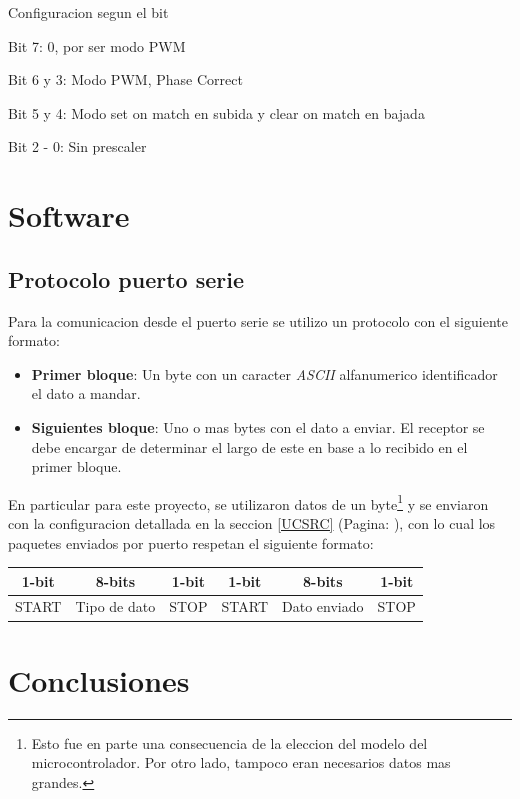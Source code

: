 \documentclass[10pt,spanish,a4paper,openany,notitlepage]{article}
\begin{document}
\begin{description}
\item{Configuracion segun el bit}
\item{Bit 7}: 0, por ser modo PWM
\item{Bit 6 y 3}: Modo PWM, Phase Correct
\item{Bit 5 y 4}: Modo set on match en subida y clear on match en bajada
\item{Bit 2 - 0}: Sin prescaler
\end{description}

\section{Software}

\subsection{Protocolo puerto serie}
Para la comunicacion desde el puerto serie se utilizo un protocolo con el siguiente formato:

\begin{itemize}
\item \textbf{Primer bloque}: Un byte con un caracter \textit{ASCII} alfanumerico identificador el dato a mandar.
\item \textbf{Siguientes bloque}: Uno o mas bytes con el dato a enviar. El receptor se debe encargar de determinar el largo de este en base a lo recibido en el primer bloque.
\end{itemize}

En particular para este proyecto, se utilizaron datos de un byte\footnote{Esto fue en parte una consecuencia de la eleccion del modelo del microcontrolador. Por otro lado, tampoco eran necesarios datos mas grandes.} y se enviaron con la configuracion detallada en la seccion \ref{UCSRC} (Pagina: \pageref{UCSRC}), con lo cual los paquetes enviados por puerto respetan el siguiente formato:

\begin{center}
\begin{tabular}{|c|c|c|c|c|c|}\hline
1-bit&8-bits&1-bit&1-bit&8-bits&1-bit\\\hline
START&Tipo de dato&STOP&START&Dato enviado&STOP\\\hline
\end{tabular}
\end{center}


\section{Conclusiones}
\end{document}

